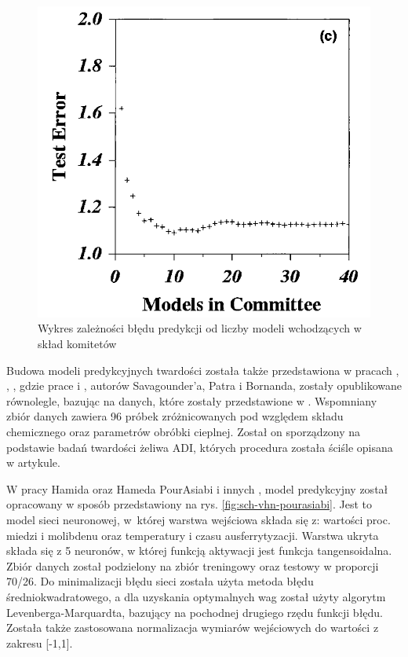\begin{figure}[ht]{}
	\centering
	\includegraphics[scale=0.35]{images/committee-plot.png}
	\caption {
		 Wykres zależności błędu predykcji od liczby modeli wchodzących w skład komitetów \cite{doi:10.1080/13640461.2003.11819537}
	}
	\label{fig:committee-plot}
\end{figure}

Budowa modeli predykcyjnych twardości została także przedstawiona w pracach \cite{POURASIABI2012782}, \cite{10.1007/978-3-030-36802-9_43}, \cite{10.1007/978-3-030-36802-9_44}, gdzie prace \cite{10.1007/978-3-030-36802-9_43} i \cite{10.1007/978-3-030-36802-9_44}, autorów Savagounder'a, Patra i Bornanda, zostały opublikowane równolegle, bazując na danych, które zostały przedstawione w \cite{POURASIABI2012782}. Wspomniany zbiór danych zawiera 96 próbek zróżnicowanych pod względem składu chemicznego oraz parametrów obróbki cieplnej. Został on sporządzony na podstawie badań twardości żeliwa ADI, których procedura została ściśle opisana w artykule.

W pracy Hamida oraz Hameda PourAsiabi i innych \cite{POURASIABI2012782}, model predykcyjny został opracowany w sposób przedstawiony na rys. \ref{fig:sch-vhn-pourasiabi}. Jest to model sieci neuronowej, w~której warstwa wejściowa składa się z: wartości proc. miedzi i molibdenu oraz temperatury i czasu ausferrytyzacji. Warstwa ukryta składa się z 5 neuronów, w której funkcją aktywacji jest funkcja tangensoidalna. Zbiór danych został podzielony na zbiór treningowy oraz testowy w proporcji 70/26. Do minimalizacji błędu sieci została użyta metoda błędu średniokwadratowego, a dla uzyskania optymalnych wag został użyty algorytm Levenberga-Marquardta, bazujący na pochodnej drugiego rzędu funkcji błędu. Została także zastosowana normalizacja wymiarów wejściowych do wartości z zakresu [-1,1].


